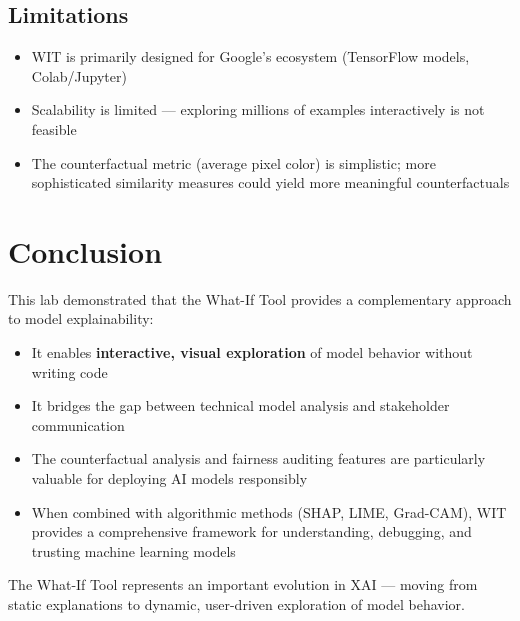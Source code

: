\documentclass[12pt,a4paper]{article}
\begin{document}
\subsection{Limitations}
\begin{itemize}
    \item WIT is primarily designed for Google's ecosystem (TensorFlow models, Colab/Jupyter)
    \item Scalability is limited --- exploring millions of examples interactively is not feasible
    \item The counterfactual metric (average pixel color) is simplistic; more sophisticated similarity measures could yield more meaningful counterfactuals
\end{itemize}

\section{Conclusion}
This lab demonstrated that the What-If Tool provides a complementary approach to model explainability:
\begin{itemize}
    \item It enables \textbf{interactive, visual exploration} of model behavior without writing code
    \item It bridges the gap between technical model analysis and stakeholder communication
    \item The counterfactual analysis and fairness auditing features are particularly valuable for deploying AI models responsibly
    \item When combined with algorithmic methods (SHAP, LIME, Grad-CAM), WIT provides a comprehensive framework for understanding, debugging, and trusting machine learning models
\end{itemize}

The What-If Tool represents an important evolution in XAI --- moving from static explanations to dynamic, user-driven exploration of model behavior.
\end{document}
